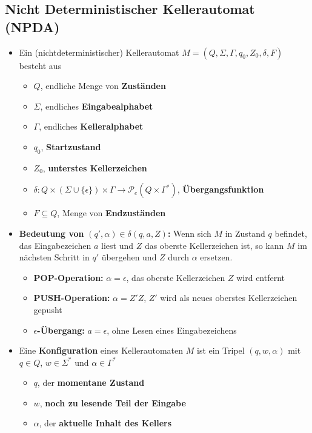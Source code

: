 \documentclass[ieeetran]{article}
\begin{document}
\subsection{Nicht Deterministischer Kellerautomat (NPDA)} %
\label{sub:kellerautomat_pDA_}
\begin{itemize}
	\item Ein (nichtdeterministischer) Kellerautomat $M = (Q, \Sigma, \Gamma, q_0, Z_0, \delta, F)$ besteht aus
\begin{itemize}
  \item $Q$, endliche Menge von \textbf{Zuständen}
\item $\Sigma$, endliches \textbf{Eingabealphabet}
\item $\Gamma$, endliches \textbf{Kelleralphabet}
\item $q_0$, \textbf{Startzustand}
\item $Z_0$, \textbf{unterstes Kellerzeichen}
\item $\delta: Q \times (\Sigma \cup \{\epsilon\}) \times \Gamma \rightarrow \mathcal{P}_e(Q \times \Gamma^*)$, \textbf{Übergangsfunktion}
\item $F \subseteq Q$, Menge von \textbf{Endzuständen}
\end{itemize}

\item \textbf{Bedeutung von }$(q', \alpha) \in \delta(q, a, Z)$\textbf{:} Wenn sich $M$ in Zustand $q$ befindet, das Eingabezeichen $a$ liest und $Z$ das oberste Kellerzeichen ist, so kann $M$ im nächsten Schritt in $q'$ übergehen und $Z$ durch $\alpha$ ersetzen.
	\begin{itemize}
	  \item \textbf{POP-Operation:} $\alpha = \epsilon$, das oberste Kellerzeichen $Z$ wird entfernt
	\item \textbf{PUSH-Operation:} $\alpha = Z'Z$, $Z'$ wird als neues oberstes Kellerzeichen gepusht
	\item \textbf{$\epsilon$-Übergang:} $a = \epsilon$, ohne Lesen eines Eingabezeichens
	\end{itemize}

\item Eine \textbf{Konfiguration} eines Kellerautomaten $M$ ist ein Tripel $(q, w, \alpha)$ mit $q \in Q$, $w \in \Sigma^*$ und $\alpha \in \Gamma^*$
	\begin{itemize}
	  \item $q$, der \textbf{momentane Zustand}
	\item $w$, \textbf{noch zu lesende Teil der Eingabe}
	\item $\alpha$, der \textbf{aktuelle Inhalt des Kellers}
	\end{itemize}


\end{itemize}
\end{document}

